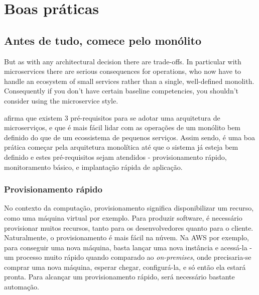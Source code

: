 \chapter{Boas práticas}\label{chapter-boas-praticas}


\section{Antes de tudo, comece pelo monólito}

\begin{citacao}
But as with any architectural decision there are trade-offs. In particular with microservices there are serious consequences for operations, who now have to handle an ecosystem of small services rather than a single, well-defined monolith. Consequently if you don't have certain baseline competencies, you shouldn't consider using the microservice style. \cite{MartinFowlerMicroservices}
\end{citacao}

 afirma que existem 3 pré-requisitos para se adotar uma arquitetura de microserviços, e que é mais fácil lidar com as operações de um monólito bem definido do que de um ecossistema de pequenos serviços. Assim sendo, é uma boa prática começar pela arquitetura monolítica até que o sistema já esteja bem definido e estes pré-requisitos sejam atendidos - provisionamento rápido, monitoramento básico, e implantação rápida de aplicação.

\subsection{Provisionamento rápido}

No contexto da computação, provisionamento significa disponibilizar um recurso, como uma máquina virtual por exemplo. Para produzir software, é necessário provisionar muitos recursos, tanto para os desenvolvedores quanto para o cliente. Naturalmente, o provisionamento é mais fácil na núvem. Na AWS por exemplo, para conseguir uma nova máquina, basta lançar uma nova instância e acessá-la - um processo muito rápido quando comparado ao \emph{on-premises}, onde precisaria-se comprar uma nova máquina, esperar chegar, configurá-la, e só então ela estará pronta. Para alcançar um provisionamento rápido, será necessário bastante automação. \cite{MartinFowlerMicroservices}

